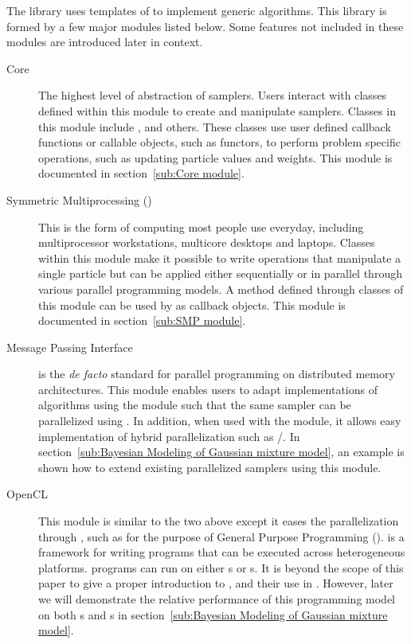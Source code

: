 \documentclass[11pt, fontset=Minion, showoverfull,
bib, mintcode, minted=cache]{marticle}
\begin{document}
The \vsmc library uses templates of \cpp to implement generic \smc algorithms.
This library is formed by a few major modules listed below. Some features not
included in these modules are introduced later in context.
\begin{description}
  \item[Core] The highest level of abstraction of \smc samplers. Users
    interact with classes defined within this module to create and manipulate
    \smc samplers. Classes in this module include ,
     and others. These classes use user defined callback
    functions or callable objects, such as functors, to perform problem
    specific operations, such as updating particle values and weights. This
    module is documented in section~\ref{sub:Core module}.
  \item[Symmetric Multiprocessing (\smp)] This is the form of computing most
    people use everyday, including multiprocessor workstations, multicore
    desktops and laptops. Classes within this module make it possible to write
    operations that manipulate a single particle but can be applied either
    sequentially or in parallel through various parallel programming models. A
    method defined through classes of this module can be used by
     as callback objects. This module is documented in
    section~\ref{sub:SMP module}.
  \item[Message Passing Interface] \lmpi is the \emph{de facto} standard for
    parallel programming on distributed memory architectures. This module
    enables users to adapt implementations of algorithms using the \smp module
    such that the same sampler can be parallelized using \lmpi. In addition,
    when used with the \smp module, it allows easy implementation of hybrid
    parallelization such as \lmpi/\lopenmp. In section~\ref{sub:Bayesian
      Modeling of Gaussian mixture model}, an example is shown how to extend
    existing \smp parallelized samplers using this module.
  \item[OpenCL] This module is similar to the two above except it eases the
    parallelization through \lopencl, such as for the purpose of General
    Purpose \gpu Programming (\gpgpu). \lopencl is a framework for writing
    programs that can be executed across heterogeneous platforms. \lopencl
    programs can run on either \cpu{}s or \gpu{}s. It is beyond the scope of
    this paper to give a proper introduction to \gpgpu, \lopencl and their use
    in \vsmc. However, later we will demonstrate the relative performance of
    this programming model on both \cpu{}s and \gpu{}s in
    section~\ref{sub:Bayesian Modeling of Gaussian mixture model}.
\end{description}
\end{document}
